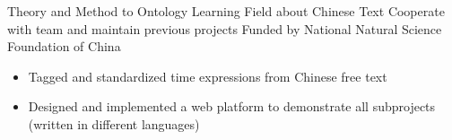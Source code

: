 {Theory and Method to Ontology Learning Field about Chinese Text}
{Cooperate with team and maintain previous projects}
{Funded by National Natural Science Foundation of China}
{}
{
  \begin{itemize}
      \item Tagged and standardized time expressions from Chinese free text
      \item Designed and implemented a web platform to demonstrate all subprojects (written in different languages)
  \end{itemize}
}
